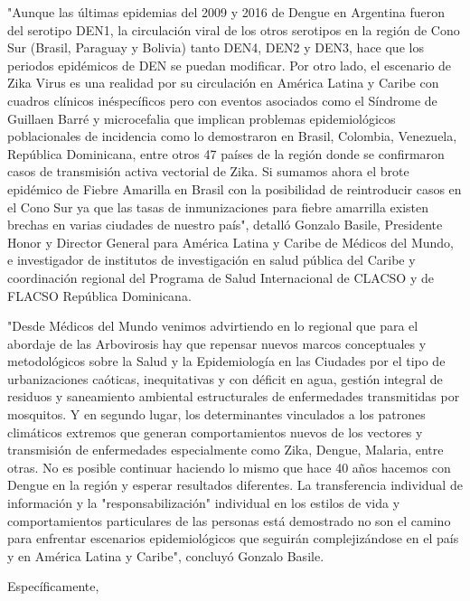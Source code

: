 "Aunque las últimas epidemias del 2009 y 2016 de Dengue en Argentina fueron del
serotipo DEN1, la circulación viral de los otros serotipos en la región de
Cono Sur (Brasil, Paraguay y Bolivia) tanto DEN4, DEN2 y DEN3, hace que los
periodos epidémicos de DEN se puedan modificar. Por otro lado, el escenario de
Zika Virus es una realidad por su circulación en América Latina y Caribe con
cuadros clínicos inéspecíficos pero con eventos asociados como el Síndrome de
Guillaen Barré y microcefalia que implican problemas epidemiológicos
poblacionales de incidencia como lo demostraron en Brasil, Colombia, Venezuela,
República Dominicana, entre otros 47 países de la región donde se confirmaron
casos de transmisión activa vectorial de Zika.
Si sumamos ahora el brote epidémico de Fiebre Amarilla en Brasil con la
posibilidad de reintroducir casos en el Cono Sur ya que las tasas de
inmunizaciones para fiebre amarrilla existen brechas en varias ciudades de nuestro país",
detalló Gonzalo Basile, Presidente Honor y Director General para
América Latina y Caribe de Médicos del Mundo, e investigador de institutos de
investigación en salud pública del Caribe y coordinación regional del Programa
de Salud Internacional de CLACSO y de FLACSO República Dominicana.





"Desde Médicos del Mundo venimos advirtiendo en lo regional que para el abordaje
de las Arbovirosis hay que repensar nuevos marcos conceptuales y metodológicos
sobre la Salud y la Epidemiología en las Ciudades por el tipo de urbanizaciones
caóticas, inequitativas y con déficit en agua, gestión integral de residuos y
saneamiento ambiental estructurales de enfermedades transmitidas por mosquitos.
Y en segundo lugar, los determinantes vinculados a los patrones climáticos
extremos que generan comportamientos nuevos de los vectores y transmisión de
enfermedades especialmente como Zika, Dengue, Malaria, entre otras.
No es posible continuar haciendo lo mismo que hace 40 años hacemos con Dengue en
la región y esperar resultados diferentes. La transferencia individual de
información y la "responsabilización" individual en los estilos de vida y
comportamientos particulares de las personas está demostrado no son el camino
para enfrentar escenarios epidemiológicos que seguirán complejizándose en el país
y en América Latina y Caribe", concluyó Gonzalo Basile.





Específicamente,


